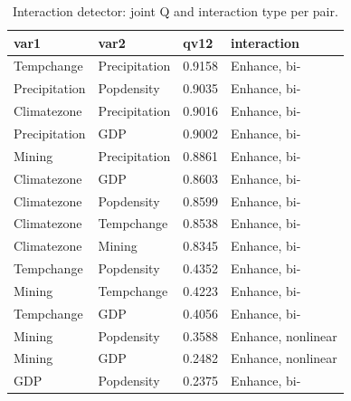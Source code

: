 \begin{table}[t]\centering
\caption{Interaction detector: joint Q and interaction type per pair.}\label{tab:interact}
\begin{tabular}{llll}
\hline
var1 & var2 & qv12 & interaction \\
\hline
Tempchange & Precipitation & 0.9158 & Enhance, bi- \\
Precipitation & Popdensity & 0.9035 & Enhance, bi- \\
Climatezone & Precipitation & 0.9016 & Enhance, bi- \\
Precipitation & GDP & 0.9002 & Enhance, bi- \\
Mining & Precipitation & 0.8861 & Enhance, bi- \\
Climatezone & GDP & 0.8603 & Enhance, bi- \\
Climatezone & Popdensity & 0.8599 & Enhance, bi- \\
Climatezone & Tempchange & 0.8538 & Enhance, bi- \\
Climatezone & Mining & 0.8345 & Enhance, bi- \\
Tempchange & Popdensity & 0.4352 & Enhance, bi- \\
Mining & Tempchange & 0.4223 & Enhance, bi- \\
Tempchange & GDP & 0.4056 & Enhance, bi- \\
Mining & Popdensity & 0.3588 & Enhance, nonlinear \\
Mining & GDP & 0.2482 & Enhance, nonlinear \\
GDP & Popdensity & 0.2375 & Enhance, bi- \\
\hline
\end{tabular}\end{table}
